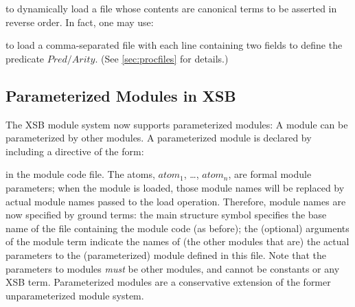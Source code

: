 
\noindent to dynamically load a file whose contents are canonical terms to be
asserted in reverse order.  In fact, one may use:


\noindent to load a comma-separated file with each line containing two
fields to define the predicate $Pred/Arity$.  (See \ref{sec:procfiles}
for details.)

\subsection{Parameterized Modules in XSB}

The XSB module system now supports parameterized modules: A module can
be parameterized by other modules.  A parameterized module is declared
by including a directive of the form:


\noindent in the module code file.  The atoms, $atom_1$, \ldots,
$atom_n$, are formal module parameters; when the module is loaded,
those module names will be replaced by actual module names passed to
the load operation.  Therefore, module names are now specified by
ground terms: the main structure symbol specifies the base name of the
file containing the module code (as before); the (optional) arguments
of the module term indicate the names of (the other modules that are)
the actual parameters to the (parameterized) module defined in this
file.  Note that the parameters to modules {\em must} be other
modules, and cannot be constants or any XSB term.  Parameterized
modules are a conservative extension of the former unparameterized
module system.

